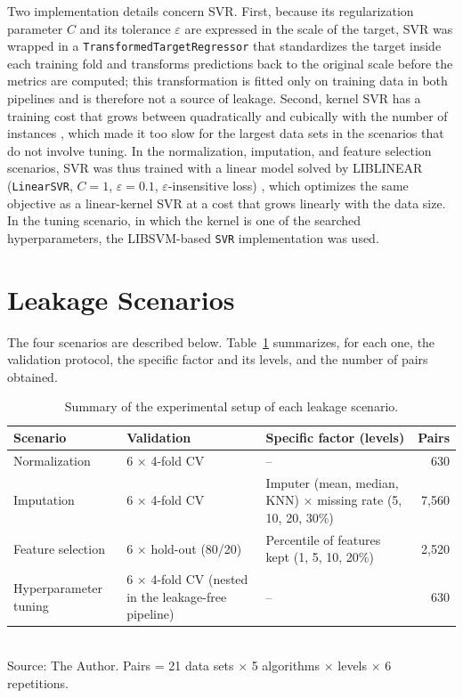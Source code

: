 Two implementation details concern SVR. First, because its regularization
parameter $C$ and its tolerance $\varepsilon$ are expressed in the scale of the
target, SVR was wrapped in a \texttt{TransformedTargetRegressor} that
standardizes the target inside each training fold and transforms predictions
back to the original scale before the metrics are computed; this transformation
is fitted only on training data in both pipelines and is therefore not a source
of leakage. Second, kernel SVR has a training cost that grows between
quadratically and cubically with the number of instances
\cite{chang2011}, which made it too slow for the largest data sets in the scenarios that do not
involve tuning. In the normalization, imputation, and
feature selection scenarios, SVR was thus trained with a linear model solved by
LIBLINEAR (\texttt{LinearSVR}, $C=1$, $\varepsilon=0.1$, $\varepsilon$-insensitive
loss) \cite{fan2008}, which optimizes the same objective as a linear-kernel SVR
at a cost that grows linearly with the data size. In the tuning scenario, in
which the kernel is one of the searched hyperparameters, the LIBSVM-based
\texttt{SVR} implementation was used.

\section{Leakage Scenarios}
\label{sec:met-cenarios}

The four scenarios are described below. Table~\ref{tab:cenarios} summarizes, for
each one, the validation protocol, the specific factor and its levels, and the
number of pairs obtained.

\begin{table}[htb]
\centering
\caption{Summary of the experimental setup of each leakage scenario.}
\label{tab:cenarios}
\small
\begin{tabular}{p{2.5cm}p{3.6cm}p{4.4cm}r}
\toprule
\textbf{Scenario} & \textbf{Validation} & \textbf{Specific factor (levels)} & \textbf{Pairs} \\
\midrule
Normalization & 6 $\times$ 4-fold CV & -- & 630 \\
Imputation & 6 $\times$ 4-fold CV & Imputer (mean, median, KNN) $\times$ missing rate (5, 10, 20, 30\%) & 7,560 \\
Feature selection & 6 $\times$ hold-out (80/20) & Percentile of features kept (1, 5, 10, 20\%) & 2,520 \\
Hyperparameter tuning & 6 $\times$ 4-fold CV (nested in the leakage-free pipeline) & -- & 630 \\
\bottomrule
\end{tabular}
\\[2pt]
\footnotesize Source: The Author. Pairs = 21 data sets $\times$ 5 algorithms $\times$ levels $\times$ 6 repetitions.
\end{table}

